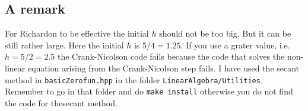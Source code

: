 \documentclass[10pt,a4paper,twoside]{article}
\begin{document}
\subsection{A remark}
For Richardon to be effective the initial $h$ should not be too big. But it can be still rather large. Here the initial $h$ is $5/4=1.25$. If you use a grater value, i.e. $h=5/2=2.5$ the Crank-Nicolson code fails because the code that solves the non-linear equation arising from the Crank-Nicolson step fails. I have used the secant method in \verb!basicZerofun.hpp! in the folder
\verb!LinearAlgebra/Utilities!. Remember to go in that folder and do \verb!make install! otherwise you do not find the code for thesecant method.



    
    
    
   
    
\end{document}
